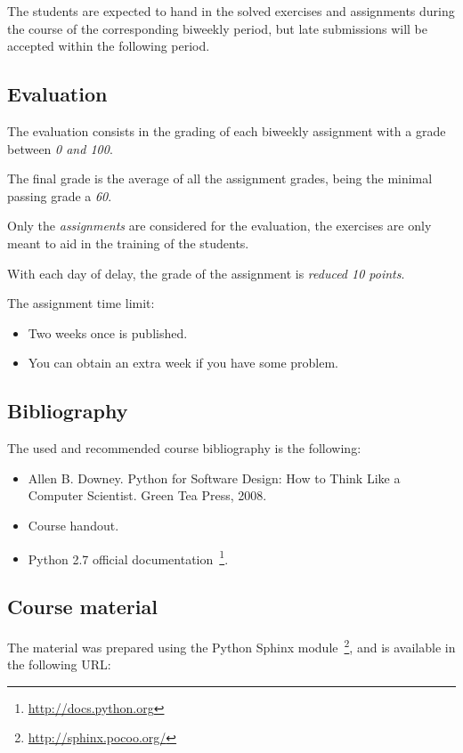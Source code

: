 \documentclass[letter, 10pt]{article}
\begin{document}
The students are expected to hand in the solved exercises and assignments
during the course of the corresponding biweekly period,
but late submissions will be accepted within the following period.

\subsection{Evaluation}

The evaluation consists in the grading of each biweekly assignment with
a grade between \emph{0 and 100}.

The final grade is the average of all the assignment grades,
being the minimal passing grade a \emph{60}. 

Only the \emph{assignments} are considered for the evaluation,
the exercises are only meant to aid in the training of the students.

With each day of delay, the grade of the assignment is \emph{reduced 10 points}.

The assignment time limit:
\begin{itemize}
    \item Two weeks once is published.
    \item You can obtain an extra week if you have some problem.
\end{itemize}

\subsection{Bibliography}

The used and recommended course bibliography is the following:

\begin{itemize}
    \item Allen B. Downey. Python for Software Design: How to Think Like a Computer Scientist. Green Tea Press, 2008.
    \item Course handout.
    \item Python 2.7 official documentation~\footnote{\url{http://docs.python.org}}.
\end{itemize}

\subsection{Course material}

The material was prepared using the Python Sphinx module~\footnote{\url{http://sphinx.pocoo.org/}},
and is available in the following URL:
\end{document}
